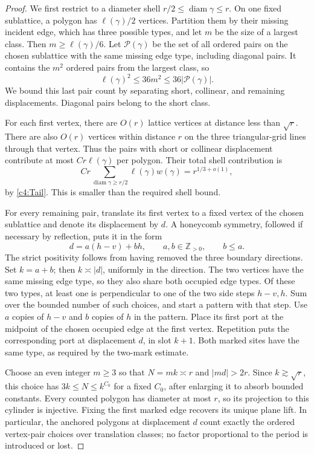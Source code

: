\begin{proof}
We first restrict to a diameter shell
$r/2\le\operatorname{diam}\gamma\le r$. On one fixed sublattice, a
polygon has $\ell(\gamma)/2$ vertices. Partition them by their missing
incident edge, which has three possible types, and let $m$ be the size
of a largest class. Then $m\ge\ell(\gamma)/6$. Let
$\mathcal P(\gamma)$ be the set of all ordered pairs on the chosen
sublattice with the same missing edge type, including diagonal pairs.
It contains the $m^2$ ordered pairs from the largest class, so
\[
             \ell(\gamma)^2\le36m^2\le36\lvert\mathcal P(\gamma)\rvert.
\]
We bound this last pair count by separating short, collinear, and
remaining displacements. Diagonal pairs belong to the short class.

For each first vertex, there are \(O(r)\) lattice vertices at distance
less than \(\sqrt r\).  There are also \(O(r)\) vertices within distance
\(r\) on the three triangular-grid lines through that vertex.  Thus the
pairs with short or collinear displacement contribute at most
\(C r\ell(\gamma)\) per polygon.  Their total shell contribution is
\[
 Cr\sum_{\operatorname{diam}\gamma\ge r/2}\ell(\gamma)w(\gamma)
       =r^{1/3+o(1)},
\]
by \eqref{c4:Tail}.  This is smaller than the required shell bound.

For every remaining pair, translate its first vertex to a fixed vertex
of the chosen sublattice and denote its displacement by \(d\).  A
honeycomb symmetry, followed if necessary by reflection, puts it in the
form
\[
 d=a(h-v)+bh,\qquad a,b\in\mathbb Z_{>0},\qquad b\le a.
\]
The strict positivity follows from having removed the three boundary
directions.  Set \(k=a+b\); then \(k\asymp|d|\), uniformly in the
direction.  The two vertices have the same missing edge type, so they
also share both occupied edge types.  Of these two types, at least one
is perpendicular to one of the two side steps \(h-v,h\).  Sum over the
bounded number of such choices, and start a pattern with that step.
Use \(a\) copies of \(h-v\) and \(b\) copies of \(h\) in the pattern.
Place its first port at the midpoint of the chosen occupied edge at the
first vertex.  Repetition puts the corresponding port at displacement
\(d\), in slot \(k+1\).  Both marked sites have the same type, as required
by the two-mark estimate.

Choose an even integer \(m\ge3\) so that \(N=mk\asymp r\) and
\(|md|>2r\).  Since \(k\gtrsim\sqrt r\), this choice has
\(3k\le N\le k^{C_0}\) for a fixed \(C_0\), after enlarging it to absorb
bounded constants.  Every counted polygon has diameter at most \(r\),
so its projection to this cylinder is injective.  Fixing the first marked
edge recovers its unique plane lift.  In particular, the anchored
polygons at displacement \(d\) count exactly the ordered vertex-pair
choices over translation classes; no factor proportional to the period
is introduced or lost.


\end{proof}
